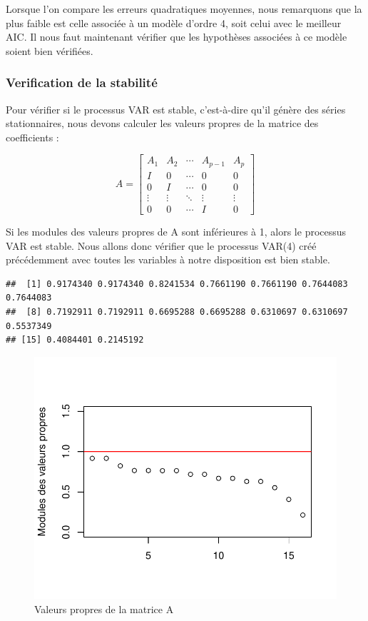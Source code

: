 \documentclass[11pt,]{article}
\begin{document}
Lorsque l'on compare les erreurs quadratiques moyennes, nous remarquons
que la plus faible est celle associée à un modèle d'ordre 4, soit celui
avec le meilleur AIC. Il nous faut maintenant vérifier que les
hypothèses associées à ce modèle soient bien vérifiées.

\subsubsection{Verification de la
stabilité}\label{verification-de-la-stabilite}

Pour vérifier si le processus VAR est stable, c'est-à-dire qu'il génère
des séries stationnaires, nous devons calculer les valeurs propres de la
matrice des coefficients :

\[A = \begin{bmatrix}
A_1 & A_2 & \cdots & A_{p-1} & A_p \\
I & 0 & \cdots & 0 & 0 \\
0 & I & \cdots & 0 & 0 \\
\vdots & \vdots & \ddots & \vdots & \vdots \\
0 & 0 & \cdots & I & 0 
\end{bmatrix}\]

Si les modules des valeurs propres de A sont inférieures à 1, alors le
processus VAR est stable. Nous allons donc vérifier que le processus
VAR(4) créé précédemment avec toutes les variables à notre disposition
est bien stable.

\begin{verbatim}
##  [1] 0.9174340 0.9174340 0.8241534 0.7661190 0.7661190 0.7644083 0.7644083
##  [8] 0.7192911 0.7192911 0.6695288 0.6695288 0.6310697 0.6310697 0.5537349
## [15] 0.4084401 0.2145192
\end{verbatim}

\begin{figure}[htbp]
\centering
\includegraphics{Rapport_final_files/figure-latex/unnamed-chunk-38-1.pdf}
\caption{\label{fig24} Valeurs propres de la matrice A}
\end{figure}
\end{document}
